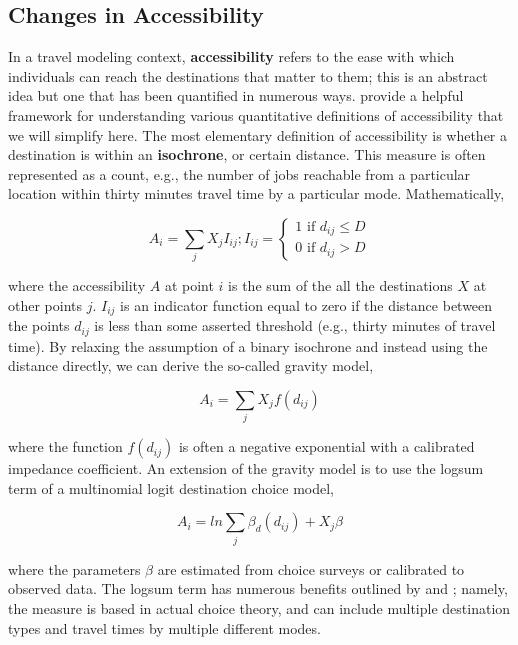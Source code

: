 \subsection{Changes in Accessibility}
In a travel modeling context, \textbf{accessibility} refers to the ease
with which
individuals can reach the destinations that matter to them; this is an
abstract
idea but one that has been quantified in numerous ways. \citet{dong2006}
provide a
helpful framework for understanding various quantitative definitions of
accessibility that we will simplify here. The most elementary definition of
accessibility is whether a destination is within an \textbf{isochrone}, or
certain
distance. This measure is often represented as a count, e.g., the number
of jobs
reachable from a particular location within thirty minutes travel time by a
particular mode. Mathematically,

\begin{equation}
A_i = \sum_{j} X_j I_{ij}; I_{ij} = \begin{cases}  1 \text{ if } d_{ij}
\leq D\\
0 \text{ if } d_{ij} > D \end{cases}
	\label{eqn:isochrone}
\end{equation}

\noindent where the accessibility \(A\) at point \(i\) is the sum of the all the
destinations \(X\) at other points \(j\). \(I_{ij}\) is an indicator
function equal to
zero if the distance between the points $d_{ij}$ is less than some asserted
threshold (e.g., thirty minutes of travel time). By relaxing the
assumption of a
binary isochrone and instead using the distance directly, we can derive the
so-called gravity model,

\begin{equation}
A_i = \sum_{j} X_j f(d_{ij})
  \label{eqn::gravity}
\end{equation}

\noindent where the function $f(d_{ij})$ is often a negative exponential with a
calibrated
impedance coefficient. An extension of the gravity model is to use the
logsum
term of a multinomial logit destination choice model,

\begin{equation}
A_i = ln\sum_{j} \beta_d(d_{ij}) + X_j\beta
  \label{eqn:logsum1}
\end{equation}

\noindent where the parameters $\beta$ are estimated from choice surveys or
calibrated to
observed data. The logsum term has numerous benefits outlined by
\citet{handy1997}
and \citet{geurs2004}; namely, the measure is based in actual choice
theory, and
can include multiple destination types and travel times by multiple
different modes.

